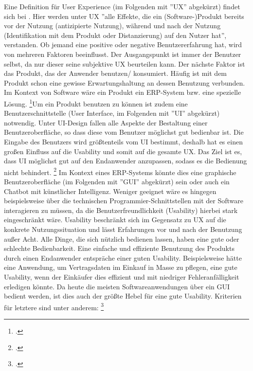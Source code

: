 Eine Definition für User Experience (im Folgenden mit ''UX'' abgekürzt) findet sich bei \cite[][(S. 26f):]{theorie_beyer_user_experience_mit_sap_2020}. Hier werden unter UX ''alle Effekte, die ein (Software-)Produkt bereits vor der Nutzung (antizipierte Nutzung), während und nach der Nutzung (Identifikation mit dem Produkt oder Distanzierung) auf den Nutzer hat'', verstanden. Ob jemand eine positive oder negative Benutzererfahrung hat, wird von mehreren Faktoren beeinflusst. Der Ausgangspunkt ist immer der Benutzer selbst, da nur dieser seine subjektive UX beurteilen kann. Der nächste Faktor ist das Produkt, das der Anwender benutzen/ konsumiert. Häufig ist mit dem Produkt schon eine gewisse Erwartungshaltung an dessen Benutzung verbunden. Im Kontext von Software wäre ein Produkt \zB ein ERP-System bzw. eine spezielle Lösung. \footcite[Vgl.][S. 27]{theorie_beyer_user_experience_mit_sap_2020}Um ein Produkt benutzen zu können ist zudem eine Benutzerschnittstelle (User Interface, im Folgenden mit ''UI'' abgekürzt) notwendig. Unter UI-Design fallen alle Aspekte der Bestaltung einer Benutzeroberfläche, so dass diese vom Benutzer möglichst gut bedienbar ist. Die Eingabe des Benutzers wird grö\ss tenteils vom UI bestimmt, deshalb hat es einen gro\ss en Einfluss auf die Usability und somit auf die gesamte UX. Das Ziel ist es, dass UI möglichst gut auf den Endanwender anzupassen, sodass es die Bedienung nicht behindert. \footcite[Vgl.][S. 31f]{theorie_beyer_user_experience_mit_sap_2020} Im Kontext eines ERP-Systems könnte dies eine graphische Benutzeroberfläche (im Folgenden mit ''GUI'' abgekürzt) sein oder auch ein Chatbot mit künstlicher Intelligenz. Weniger geeignet wäre es hingegen beispielsweise über die technischen Programmier-Schnittstellen mit der Software interagieren zu müssen, da die Benutzerfreundlichkeit (Usability) hierbei stark eingeschränkt wäre. Usability beschränkt sich im Gegensatz zu UX auf die konkrete Nutzungssituation und lässt Erfahrungen vor und nach der Benutzung au\ss er Acht. Alle Dinge, die sich nützlich bedienen lassen, haben eine gute oder schlechte Bedienbarkeit. Eine einfache und effiziente Benutzung des Produkts durch einen Endanwender entspräche einer guten Usability. Beispielsweise hätte eine Anwendung, um Vertragsdaten im Einkauf in Masse zu pflegen, eine gute Usability, wenn der Einkäufer dies effizient und mit niedriger Fehleranfälligkeit erledigen könnte. Da heute die meisten Softwareanwendungen über ein GUI bedient werden, ist dies auch der grö\ss te Hebel für eine gute Usability. Kriterien für letztere sind unter anderem: \footcite[Vgl.][]{theorie_ux_din_iso_9241_110_2006}

